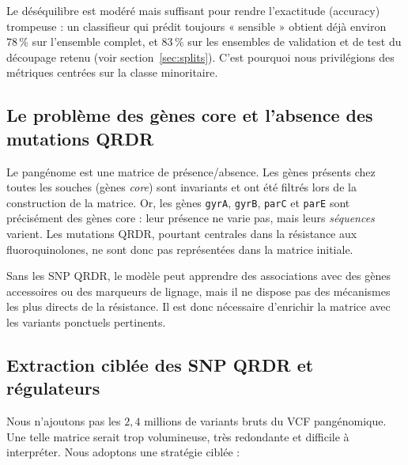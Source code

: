 \documentclass[11pt,a4paper]{article}
\begin{document}
Le déséquilibre est modéré mais suffisant pour rendre l'exactitude (accuracy) trompeuse : un classifieur qui prédit toujours « sensible » obtient déjà environ $78\,\%$ sur l'ensemble complet, et $83\,\%$ sur les ensembles de validation et de test du découpage retenu (voir section~\ref{sec:splits}). C'est pourquoi nous privilégions des métriques centrées sur la classe minoritaire.

\subsection{Le problème des gènes core et l'absence des mutations QRDR}

Le pangénome est une matrice de présence/absence. Les gènes présents chez toutes les souches (gènes \emph{core}) sont invariants et ont été filtrés lors de la construction de la matrice. Or, les gènes \texttt{gyrA}, \texttt{gyrB}, \texttt{parC} et \texttt{parE} sont précisément des gènes core : leur présence ne varie pas, mais leurs \emph{séquences} varient. Les mutations QRDR, pourtant centrales dans la résistance aux fluoroquinolones, ne sont donc pas représentées dans la matrice initiale.

\begin{warnbox}[Conséquence]
Sans les SNP QRDR, le modèle peut apprendre des associations avec des gènes accessoires ou des marqueurs de lignage, mais il ne dispose pas des mécanismes les plus directs de la résistance. Il est donc nécessaire d'enrichir la matrice avec les variants ponctuels pertinents.
\end{warnbox}

\subsection{Extraction ciblée des SNP QRDR et régulateurs}

Nous n'ajoutons pas les $2{,}4$ millions de variants bruts du VCF pangénomique. Une telle matrice serait trop volumineuse, très redondante et difficile à interpréter. Nous adoptons une stratégie ciblée :
\end{document}
